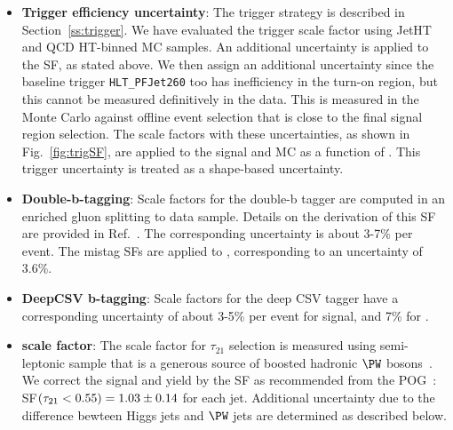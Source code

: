 \begin{itemize}
\item \textbf{Trigger efficiency uncertainty}: The trigger strategy is described in Section~\ref{ss:trigger}. We have evaluated the trigger scale factor using JetHT and QCD HT-binned MC samples. An additional uncertainty is applied to the SF, as stated above. We then assign an additional uncertainty since the baseline trigger \texttt{HLT\_PFJet260} too has inefficiency in the turn-on region, but this cannot be measured definitively in the data. This is measured in the Monte Carlo against offline event selection that is close to the final signal region selection. The scale factors with these uncertainties, as shown in Fig.~\ref{fig:trigSF}, are applied to the signal and \ttbar MC as a function of \mjjs. This trigger uncertainty is treated as a shape-based uncertainty.
  
\item \textbf{Double-b-tagging}: Scale factors for the double-b tagger are computed in an enriched gluon splitting to \bbbar data sample. Details on the derivation of this SF are provided in Ref.~\cite{DoubleBSFTWiki}. The corresponding uncertainty is about 3-7\% per event. The mistag SFs are applied to \ttbar, corresponding to an uncertainty of 3.6\%.

\item \textbf{DeepCSV b-tagging}: Scale factors for the deep CSV tagger have a corresponding uncertainty of about 3-5\% per event for signal, and 7\% for \ttbar.

\item \textbf{\nsub scale factor}: The scale factor for $\tau_{21}$ selection is measured using semi-leptonic \ttbar sample that is a generous source of boosted hadronic $\PW$ bosons~\cite{CMS-AN-17-051}. We correct the signal and \ttbar yield by the SF as recommended from the POG~\cite{Wtagging}: SF$(\tau_{21} < 0.55) = 1.03 \pm 0.14$ for each jet. Additional uncertainty due to the difference bewteen Higgs jets and $\PW$ jets are determined as described below.
  

\end{itemize}
